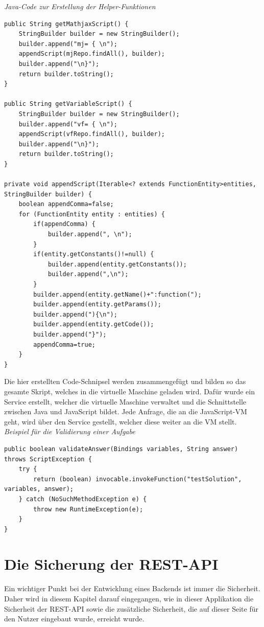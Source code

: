 \emph{Java-Code zur Erstellung der Helper-Funktionen}
\begin{lstlisting}
public String getMathjaxScript() {
	StringBuilder builder = new StringBuilder();
	builder.append("mj= { \n");
	appendScript(mjRepo.findAll(), builder);
	builder.append("\n}");
	return builder.toString();
}

public String getVariableScript() {
	StringBuilder builder = new StringBuilder();
	builder.append("vf= { \n");
	appendScript(vfRepo.findAll(), builder);
	builder.append("\n}");
	return builder.toString();
}

private void appendScript(Iterable<? extends FunctionEntity>entities, StringBuilder builder) {
	boolean appendComma=false;
	for (FunctionEntity entity : entities) {
		if(appendComma) {
			builder.append(", \n");
		}
		if(entity.getConstants()!=null) {
			builder.append(entity.getConstants());
			builder.append(",\n");
		}
		builder.append(entity.getName()+":function(");
		builder.append(entity.getParams());
		builder.append("){\n");
		builder.append(entity.getCode());
		builder.append("}");
		appendComma=true;
	}
}

\end{lstlisting}

Die hier erstellten Code-Schnipsel werden zusammengefügt und bilden so das gesamte Skript, welches in die virtuelle Maschine geladen wird. Dafür wurde ein Service erstellt, welcher die virtuelle Maschine verwaltet und die Schnittstelle zwischen Java und JavaScript bildet. Jede Anfrage, die an die JavaScript-VM geht, wird über den Service gestellt, welcher diese weiter an die VM stellt.\\

\emph{Beispiel für die Validierung einer Aufgabe}
\begin{lstlisting}
public boolean validateAnswer(Bindings variables, String answer) throws ScriptException {
	try {
		return (boolean) invocable.invokeFunction("testSolution", variables, answer);
	} catch (NoSuchMethodException e) {
		throw new RuntimeException(e);
	}
}
\end{lstlisting}

\section{Die Sicherung der REST-API}

Ein wichtiger Punkt bei der Entwicklung eines Backends ist immer die Sicherheit. Daher wird in diesem Kapitel darauf eingegangen, wie in dieser Applikation die Sicherheit der REST-API sowie die zusätzliche Sicherheit, die auf dieser Seite für den Nutzer eingebaut wurde, erreicht wurde. \\


